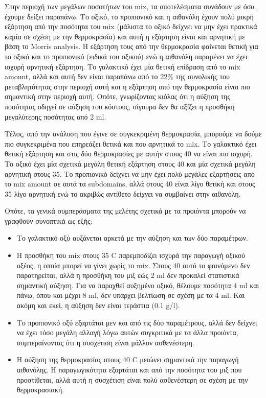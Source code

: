 \documentclass[11pt]{article}
\begin{document}
Στην περιοχή των μεγάλων ποσοτήτων του mix, τα αποτελέσματα συνάδουν με όσα έχουμε δείξει παραπάνω. Το οξικό, το προπιονικό και η αιθανόλη έχουν πολύ μικρή εξάρτηση από την ποσότητα του mix (μάλιστα το οξικό δείχνει να μην έχει πρακτικά καμία σε σχέση με την θερμοκρασία) και αυτή η εξάρτηση είναι και αρνητική με βάση το Morris analysis. Η εξάρτηση τους από την θερμοκρασία φαίνεται θετική για το οξικό και το προπιονικό (ειδικά του οξικού) ενώ η αιθανόλη παραμένει να έχει ισχυρή αρνητική εξάρτηση. Το γαλακτικό έχει μία θετική επίδραση από το mix amount, αλλά και αυτή δεν είναι παραπάνω από το 22\% της συνολικής του μεταβλητότητας στην περιοχή αυτή και η εξάρτηση από την θερμοκρασία είναι πιο σημαντική στην περιοχή αυτή. Οπότε, γνωρίζοντας κιόλας ότι η αύξηση της ποσότητας οδηγεί σε αύξηση του κόστους, σίγουρα δεν θα αξίζει η προσθήκη μεγαλύτερης ποσότητας από 2 ml.

Τέλος, από την ανάλυση που έγινε σε συγκεκριμένη θερμοκρασία, μπορούμε να δούμε πιο συγκεκριμένα που επηρεάζει θετικά και που αρνητικά το mix. Το γαλακτικό έχει θετική εξάρτηση και στις δύο θερμοκρασίες με αυτήν στους 40 να είναι πιο ισχυρή. Το οξικό έχει μία σχετικά μεγάλη θετική εξάρτηση στους 40 και μία σχετικά μεγάλη αρνητική στους 35. Το προπιονικό δείχνει να μην έχει πολύ μεγάλες εξαρτήσεις από το mix amount σε αυτά τα subdomains, αλλά στους 40 είναι λίγο θετική και στους 35 λίγο αρνητική ενώ το ακριβώς αντίθετο δείχνει να συμβαίνει στην αιθανόλη.

Οπότε, τα γενικά συμπεράσματα της μελέτης σχετικά με τα προιόντα μπορούν να γραφθούν συνοπτικά ως εξής:
\begin{itemize}
\item Το γαλακτικό οξύ αυξάνεται αρκετά με την αύξηση και των δύο παραμέτρων.
\item Η προσθήκη του mix στους 35 C παρεμποδίζει ισχυρά την παραγωγή οξικού οξέος, η οποία μπορεί να γίνει χωρίς το mix. Στους 40 αυτό το φαινόμενο δεν παρατηρείται, αλλά η προσθήκη του μιξ εώς 2 ml δεν προκαλεί στατιστικά σημαντική αύξηση. Για να παραχθεί αυξημένο οξικό, θέλουμε ποσότητα 4 ml και πάνω, όπου και μέχρι 8 ml, δεν υπάρχει βελτίωση σε σχέση με τα 4 ml. Και ακόμη και εκεί, η αύξηση δεν είναι τεράστια (0.1 g/l).
\item Το προπιονικό οξύ εξαρτάται μεν και από τις δύο παραμέτρους, αλλά δεν δείχνει να έχει τόσο μεγάλη αλλαγή λόγω αυτών συγκριτικά με τα άλλα προιόντα, συμπεραίνοντας ότι η συσχέτιση είναι μάλλον ασθενέστερη.
\item Η αύξηση της θερμοκρασίας στους 40 C μειώνει σημαντικά την παραγωγή αιθανόλης. Η παραγωγικότητα εξαρτάται και από την ποσότητα του μιξ που προστίθεται, αλλά αυτή η συσχέτιση είναι πολύ ασθενέστερη σε σχέση με την θερμοκρασιακή.
\end{itemize}
\end{document}
